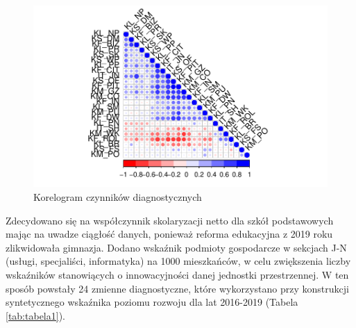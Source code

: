 \documentclass{amuthesis}
\begin{document}
\begin{figure}[t]

{\centering \includegraphics[width=1.3\linewidth]{figures/rycina1-1} 

}

\caption{Korelogram czynników diagnostycznych}\label{fig:rycina1}
\end{figure}

Zdecydowano się na współczynnik skolaryzacji netto dla szkół podstawowych mając na uwadze ciągłość danych, ponieważ reforma edukacyjna z 2019 roku zlikwidowała gimnazja.
Dodano wskaźnik podmioty gospodarcze w sekcjach J-N (usługi, specjaliści, informatyka) na 1000 mieszkańców, w celu zwiększenia liczby wskaźników stanowiących o innowacyjności danej jednostki przestrzennej.
W ten sposób powstały 24 zmienne diagnostyczne, które wykorzystano przy konstrukcji syntetycznego wskaźnika poziomu rozwoju dla lat 2016-2019 (Tabela \ref{tab:tabela1}).
\end{document}

